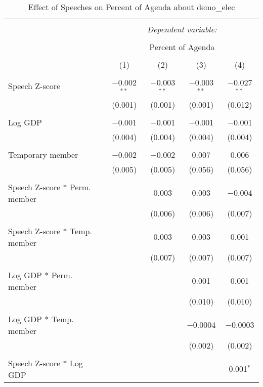 
\begin{table}[!htbp] \centering 
  \caption{Effect of Speeches on Percent of Agenda about demo_elec} 
  \label{} 
\begin{tabular}{@{\extracolsep{5pt}}lcccc} 
\\[-1.8ex]\hline 
\hline \\[-1.8ex] 
 & \multicolumn{4}{c}{\textit{Dependent variable:}} \\ 
\cline{2-5} 
\\[-1.8ex] & \multicolumn{4}{c}{Percent of Agenda} \\ 
\\[-1.8ex] & (1) & (2) & (3) & (4)\\ 
\hline \\[-1.8ex] 
 Speech Z-score & $-$0.002$^{**}$ & $-$0.003$^{**}$ & $-$0.003$^{**}$ & $-$0.027$^{**}$ \\ 
  & (0.001) & (0.001) & (0.001) & (0.012) \\ 
  & & & & \\ 
 Log GDP & $-$0.001 & $-$0.001 & $-$0.001 & $-$0.001 \\ 
  & (0.004) & (0.004) & (0.004) & (0.004) \\ 
  & & & & \\ 
 Temporary member & $-$0.002 & $-$0.002 & 0.007 & 0.006 \\ 
  & (0.005) & (0.005) & (0.056) & (0.056) \\ 
  & & & & \\ 
 Speech Z-score * Perm. member &  & 0.003 & 0.003 & $-$0.004 \\ 
  &  & (0.006) & (0.006) & (0.007) \\ 
  & & & & \\ 
 Speech Z-score * Temp. member &  & 0.003 & 0.003 & 0.001 \\ 
  &  & (0.007) & (0.007) & (0.007) \\ 
  & & & & \\ 
 Log GDP * Perm. member &  &  & 0.001 & 0.001 \\ 
  &  &  & (0.010) & (0.010) \\ 
  & & & & \\ 
 Log GDP * Temp. member &  &  & $-$0.0004 & $-$0.0003 \\ 
  &  &  & (0.002) & (0.002) \\ 
  & & & & \\ 
 Speech Z-score * Log GDP &  &  &  & 0.001$^{*}$ \\ 

\end{tabular}
\end{table}

